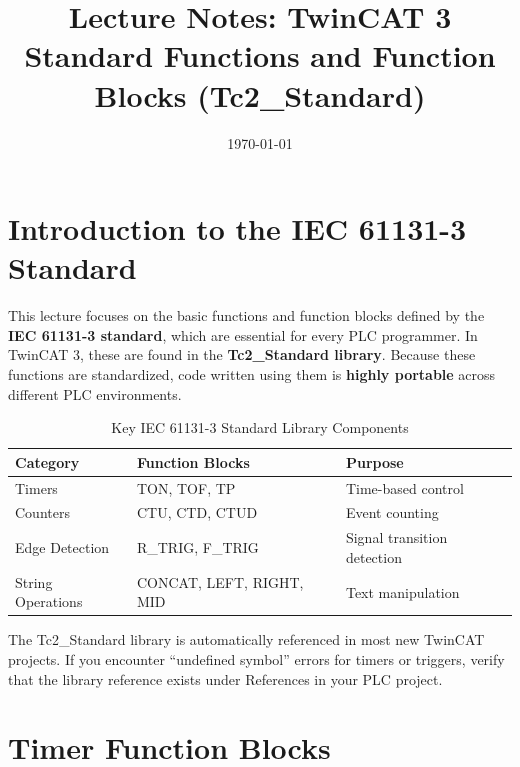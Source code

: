 \documentclass[11pt,a4paper]{article}
\title{
    \vspace{-1cm}
    \textbf{Lecture Notes: TwinCAT 3}\\
    \Large Standard Functions and Function Blocks (Tc2\_Standard)
}
\author{}
\date{\today}
\begin{document}
\maketitle

\tableofcontents
\newpage

\section{Introduction to the IEC 61131-3 Standard}

This lecture focuses on the basic functions and function blocks defined by the \textbf{IEC 61131-3 standard}, which are essential for every PLC programmer. In TwinCAT 3, these are found in the \textbf{Tc2\_Standard library}. Because these functions are standardized, code written using them is \textbf{highly portable} across different PLC environments.

\begin{table}[h]
\centering
\begin{tabular}{@{}lll@{}}
\toprule
\textbf{Category} & \textbf{Function Blocks} & \textbf{Purpose} \\
\midrule
Timers & TON, TOF, TP & Time-based control \\
Counters & CTU, CTD, CTUD & Event counting \\
Edge Detection & R\_TRIG, F\_TRIG & Signal transition detection \\
String Operations & CONCAT, LEFT, RIGHT, MID & Text manipulation \\
\bottomrule
\end{tabular}
\caption{Key IEC 61131-3 Standard Library Components}
\end{table}

\begin{notebox}
The Tc2\_Standard library is automatically referenced in most new TwinCAT projects. If you encounter ``undefined symbol'' errors for timers or triggers, verify that the library reference exists under References in your PLC project.
\end{notebox}

\section{Timer Function Blocks}
\end{document}
